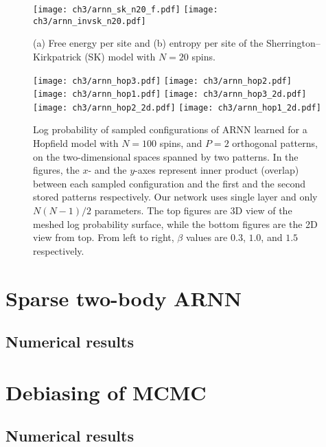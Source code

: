 \begin{figure}[htb]
\centering
\texttt{[image: ch3/arnn\_sk\_n20\_f.pdf]}
\texttt{[image: ch3/arnn\_invsk\_n20.pdf]}
\caption[ARNN results of Sherrington--Kirkpatrick model]{
(a) Free energy per site and (b) entropy per site of the Sherrington--Kirkpatrick (SK) model with $N = 20$ spins.
}
\label{fig:arnn-sk}
\end{figure}

\begin{figure}[htb]
\centering
\texttt{[image: ch3/arnn\_hop3.pdf]}
\texttt{[image: ch3/arnn\_hop2.pdf]}
\texttt{[image: ch3/arnn\_hop1.pdf]}
\texttt{[image: ch3/arnn\_hop3\_2d.pdf]}
\texttt{[image: ch3/arnn\_hop2\_2d.pdf]}
\texttt{[image: ch3/arnn\_hop1\_2d.pdf]}
\caption[ARNN results of Hopfield model]{
Log probability of sampled configurations of ARNN learned for a Hopfield model with $N = 100$ spins, and $P = 2$ orthogonal patterns, on the two-dimensional spaces spanned by two patterns. In the figures, the $x$- and the $y$-axes represent inner product (overlap) between each sampled configuration and the first and the second stored patterns respectively. Our network uses single layer and only $N (N - 1) / 2$ parameters. The top figures are 3D view of the meshed log probability surface, while the bottom figures are the 2D view from top. From left to right, $\beta$ values are $0.3$, $1.0$, and $1.5$ respectively.
}
\label{fig:arnn-hop}
\end{figure}

\section{Sparse two-body ARNN}

\cite{biazzo2024sparse}

\subsection{Numerical results}

\section{Debiasing of MCMC}
\label{sec:ncus}

\cite{wu2021unbiased}

\subsection{Numerical results}
